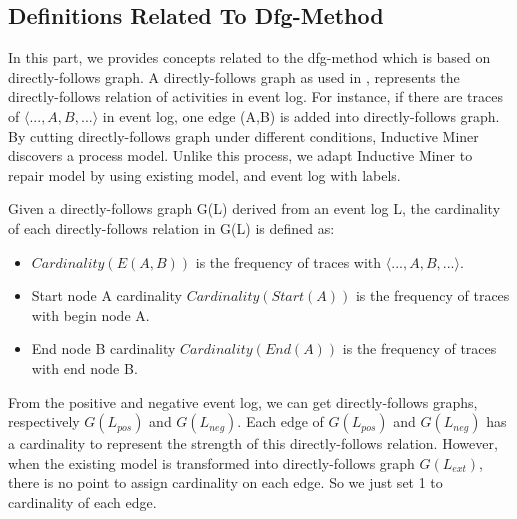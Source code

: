 \subsection{Definitions Related To Dfg-Method}
In this part, we provides concepts related to the dfg-method which is based on directly-follows graph. A directly-follows graph as used in \cite{leemans2013discovering}, represents the directly-follows relation of activities in event log. For instance, if there are traces of $\langle ...,A,B,... \rangle$ in event log, one edge (A,B) is added into directly-follows graph. By cutting directly-follows graph under different conditions, Inductive Miner\cite{leemans2013discovering,leemans2014discovering} discovers a process model. Unlike this process, we adapt Inductive Miner to repair model by using existing model, and event log with labels.

\begin{definition}
	Given a directly-follows graph G(L) derived from an event log L, the cardinality of each directly-follows relation in G(L) is defined as:  
	\begin{itemize}
		\item $Cardinality(E(A,B))$ is the frequency of traces with $\langle ...,A,B,... \rangle$. 
		\item Start node A cardinality $Cardinality(Start(A))$ is the frequency of traces with begin node A.
		\item End node B cardinality $Cardinality(End(A))$ is the frequency of traces with end node B.
	\end{itemize}	
\end{definition}
From the positive and negative event log, we can get directly-follows graphs, respectively $G(L_{pos})$ and $G(L_{neg})$. Each edge of  $G(L_{pos})$ and $G(L_{neg})$ has a cardinality to represent the strength of this directly-follows relation. 
However, when the existing model is transformed into  directly-follows graph $G(L_{ext})$, there is no point to assign cardinality on each edge. So we just set 1 to cardinality of each edge. 


